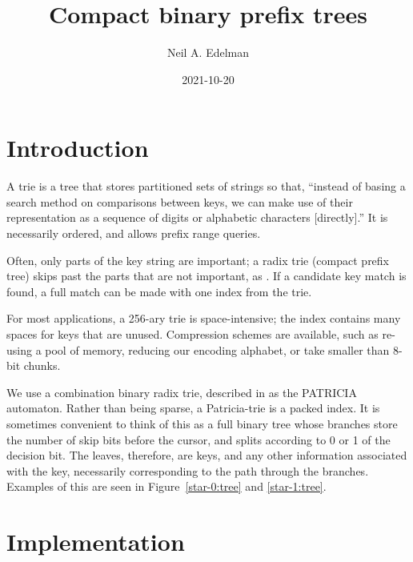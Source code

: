 \documentclass[12pt]{article}
\author{Neil A. Edelman}
\title{Compact binary prefix trees}
\date{2021-10-20}
\begin{document}
\maketitle


\section{Introduction}

A trie is a tree that stores partitioned sets of strings\cite{de1959file, fredkin1960trie, jacquet1991analysis, askitis2011redesigning} so that, ``instead of basing a search method on comparisons between keys, we can make use of their representation as a sequence of digits or alphabetic characters [directly].\cite{knuth1997sorting}'' It is necessarily ordered, and allows prefix range queries.

Often, only parts of the key string are important; a radix trie (compact prefix tree) skips past the parts that are not important, as \cite{askitis2007hat}. If a candidate key match is found, a full match can be made with one index from the trie.

For most applications, a 256-ary trie is space-intensive; the index contains many spaces for keys that are unused. Compression schemes are available, such as re-using a pool of memory\cite{de1959file}, reducing our encoding alphabet, or take smaller than 8-bit chunks\cite{fredkin1960trie}.

We use a combination binary radix trie, described in \cite{morrison1968patricia} as the PATRICIA automaton. Rather than being sparse, a Patricia-trie is a packed index. It is sometimes convenient to think of this as a full binary tree whose branches store the number of skip bits before the cursor, and splits according to 0 or 1 of the decision bit. The leaves, therefore, are keys, and any other information associated with the key, necessarily corresponding to the path through the branches. Examples of this are seen in Figure~\ref{star-0:tree} and \ref{star-1:tree}.

\section{Implementation}
\end{document}
